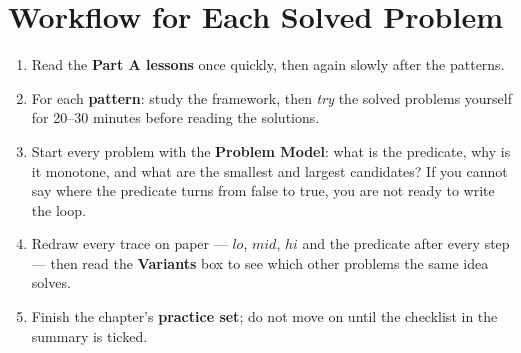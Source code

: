 \section*{Workflow for Each Solved Problem}

\begin{insightbox}
\begin{center}
\end{center}
\begin{enumerate}[leftmargin=*]
    \item Read the \textbf{Part A lessons} once quickly, then again slowly after the patterns.
    \item For each \textbf{pattern}: study the framework, then \emph{try} the solved problems yourself for 20--30 minutes before reading the solutions.
    \item Start every problem with the \textbf{Problem Model}: what is the predicate, why is it monotone, and what are the smallest and largest candidates? If you cannot say where the predicate turns from false to true, you are not ready to write the loop.
    \item Redraw every trace on paper --- $lo$, $mid$, $hi$ and the predicate after every step --- then read the \textbf{Variants} box to see which other problems the same idea solves.
    \item Finish the chapter's \textbf{practice set}; do not move on until the checklist in the summary is ticked.
\end{enumerate}
\end{insightbox}

